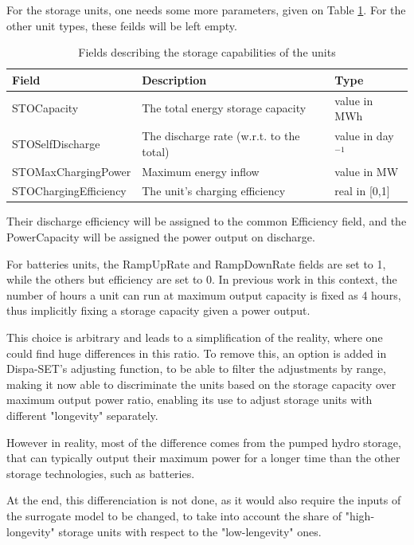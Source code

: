 For the storage units, one needs some more parameters, given on Table \ref{table:plant-storage-db}. For the other unit types, these feilds will be left empty.

\begin{table}[h]
    \centering
    \begin{tabular}{|l l l|}
        \hline
        Field                 & Description                       & Type          \\ \hline
        STOCapacity           & The total energy storage capacity & value in MWh  \\
        STOSelfDischarge      & The discharge rate (w.r.t. to the total) & value in day$^{-1}$ \\
        STOMaxChargingPower   & Maximum energy inflow             & value in MW   \\
        STOChargingEfficiency & The unit's charging efficiency    & real in [0,1] \\ \hline
    \end{tabular}
    \caption{Fields describing the storage capabilities of the units}
    \label{table:plant-storage-db}
\end{table}


Their discharge efficiency will be assigned to the common Efficiency field, and the PowerCapacity will be assigned the power output on discharge.

For batteries units, the RampUpRate and RampDownRate fields are set to 1, while the others but efficiency are set to 0. In previous work in this context, the number of hours a unit can run at maximum output capacity is fixed as 4 hours, thus implicitly fixing a storage capacity given a power output.

This choice is arbitrary and leads to a simplification of the reality, where one could find huge differences in this ratio. To remove this, an option is added in Dispa-SET's adjusting function, to be able to filter the adjustments by range, making it now able to discriminate the units based on the storage capacity over maximum output power ratio, enabling its use to adjust storage units with different "longevity" separately.

However in reality, most of the difference comes from the pumped hydro storage, that can typically output their maximum power for a longer time than the other storage technologies, such as batteries.

At the end, this differenciation is not done, as it would also require the inputs of the surrogate model to be changed, to take into account the share of "high-longevity" storage units with respect to the "low-lengevity" ones.

